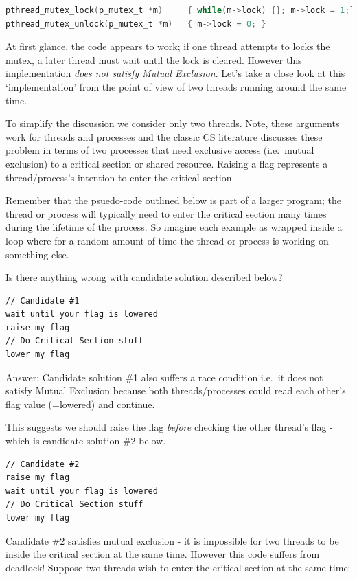 \begin{lstlisting}[language=C]
pthread_mutex_lock(p_mutex_t *m)     { while(m->lock) {}; m->lock = 1;}
pthread_mutex_unlock(p_mutex_t *m)   { m->lock = 0; }
\end{lstlisting}

At first glance, the code appears to work; if one thread attempts to locks the mutex, a later thread must wait until the lock is cleared. However this implementation \emph{does not satisfy Mutual Exclusion}. Let's take a close look at this `implementation' from the point of view of two threads running around the same time.


To simplify the discussion we consider only two threads. Note, these arguments work for threads and processes and the classic CS literature discusses these problem in terms of two processes that need exclusive access (i.e.~mutual exclusion) to a critical section or shared resource. Raising a flag represents a thread/process's intention to enter the critical section.

Remember that the psuedo-code outlined below is part of a larger program; the thread or process will typically need to enter the critical section many times during the lifetime of the process. So imagine each example as wrapped inside a loop where for a random amount of time the thread or process is working on something else.

Is there anything wrong with candidate solution described below?

\begin{lstlisting}
// Candidate #1
wait until your flag is lowered
raise my flag
// Do Critical Section stuff
lower my flag 
\end{lstlisting}

Answer: Candidate solution \#1 also suffers a race condition i.e.~it does not satisfy Mutual Exclusion because both threads/processes could read each other's flag value (=lowered) and continue.

This suggests we should raise the flag \emph{before} checking the other thread's flag - which is candidate solution \#2 below.

\begin{lstlisting}
// Candidate #2
raise my flag
wait until your flag is lowered
// Do Critical Section stuff
lower my flag 
\end{lstlisting}

Candidate \#2 satisfies mutual exclusion - it is impossible for two threads to be inside the critical section at the same time. However this code suffers from deadlock! Suppose two threads wish to enter the critical section at the same time:

